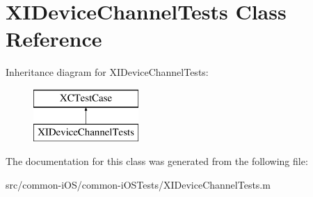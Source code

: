 \hypertarget{interface_x_i_device_channel_tests}{}\section{X\+I\+Device\+Channel\+Tests Class Reference}
\label{interface_x_i_device_channel_tests}
Inheritance diagram for X\+I\+Device\+Channel\+Tests\+:\begin{figure}[H]
\begin{center}
\leavevmode
\includegraphics[height=2.000000cm]{interface_x_i_device_channel_tests}
\end{center}
\end{figure}


The documentation for this class was generated from the following file\+:\begin{DoxyCompactItemize}
\item 
src/common-\/i\+O\+S/common-\/i\+O\+S\+Tests/X\+I\+Device\+Channel\+Tests.\+m\end{DoxyCompactItemize}
